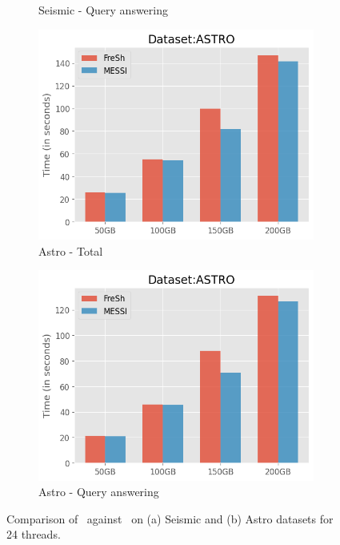 \begin{figure}[htbp]
\begin{subfigure}{0.45\textwidth}
        \caption{Seismic - Query answering}
        \label{fig:eval:scale-dataset:seismic:QueryAnswering}
    \end{subfigure}        
    \begin{subfigure}{0.45\textwidth}
        \includegraphics[width=\textwidth]{figures/Experiments/scale-dataset-astro-total.png}
        \caption{Astro - Total}
        \label{fig:eval:scale-dataset:astro:total}
    \end{subfigure}
    \begin{subfigure}{0.45\textwidth}
        \includegraphics[width=\textwidth]{figures/Experiments/scale-dataset-astro-query.png}
        \caption{Astro - Query answering}
        \label{fig:eval:scale-dataset:astro:QueryAnswering}
    \end{subfigure}    

    \caption{Comparison of \Fresh\ against \MESSI\ on (a) Seismic and (b) Astro datasets for 24 threads.}
    \label{fig:eval:scale-dataset:real}
\end{figure}

